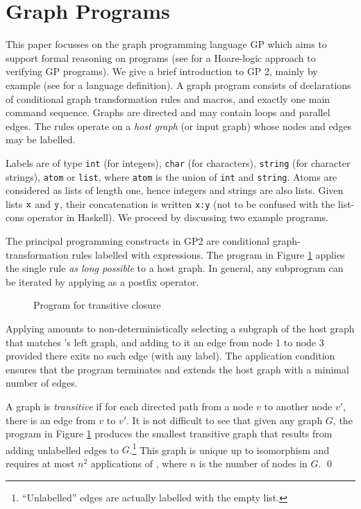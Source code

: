 \section{Graph Programs}
\label{sec:graph-programs}

This paper focusses on the graph programming language GP \cite{Plump09a,Plump12a} which aims to support formal reasoning on programs (see \cite{Poskitt-Plump12a} for a Hoare-logic approach to verifying GP programs). We give a brief introduction to GP 2, mainly by example (see \cite{Plump12a} for a language definition). A graph program consists of declarations of conditional graph transformation rules and macros, and exactly one main command sequence. Graphs are directed and may contain  loops and parallel edges. The rules operate on a \emph{host graph}\/ (or input graph) whose nodes and edges may be labelled.

Labels are of type \texttt{int} (for integers), \texttt{char} (for characters), \texttt{string} (for character strings), \texttt{atom} or \texttt{list}, where \texttt{atom} is the union of \texttt{int} and \texttt{string}. Atoms are considered as lists of length one, hence integers and strings are also lists. Given lists $\mathtt{x}$ and $\mathtt{y}$, their concatenation is written \texttt{x:y} (not to be confused with the list-cons operator in Haskell). 
We proceed by discussing two example programs.

\begin{example}
The principal programming constructs in GP2 are conditional graph-transformation rules labelled with expressions. The program in Figure \ref{fig:transitive-closure} applies the single rule  \emph{as long possible} to a host graph. In general, any subprogram can be iterated by applying \ttt{!} as a postfix operator.

\begin{figure}[htb]
\begin{center}
 
\end{center}
\caption{Program for transitive closure}\label{fig:transitive-closure}
\end{figure}

Applying  amounts to non-deterministically selecting a subgraph of the host graph that matches 's left graph, and adding to it an edge from node 1 to node 3 provided there exits no such edge (with any label). The application condition ensures that the program terminates and extends the host graph with a minimal number of edges.

A graph is \emph{transitive} if for each directed path from a node $v$ to another node $v'$, there is an edge from $v$ to $v'$. It is not difficult to see that given any graph $G$, the program in Figure \ref{fig:transitive-closure} produces the smallest transitive graph that results from adding unlabelled edges to $G$.\footnote{``Unlabelled'' edges are actually labelled with the empty list.} This graph is unique up to isomorphism and requires at most $n^2$ applications of , where $n$\/ is the number of nodes in $G$. \qed
\end{example}
  

